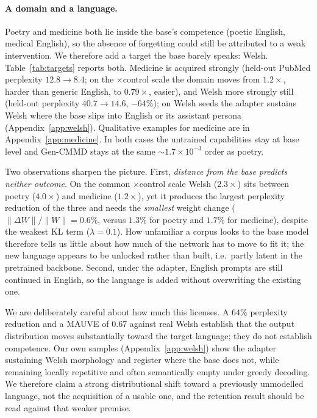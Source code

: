 \documentclass{article}
\begin{document}
\paragraph{A domain and a language.}
Poetry and medicine both lie inside the base's competence (poetic English,
medical English), so the absence of forgetting could still be attributed to a
weak intervention. We therefore add a target the base barely speaks: Welsh.
Table~\ref{tab:targets} reports both. Medicine is acquired strongly (held-out
PubMed perplexity $12.8\to8.4$; on the $\times$control scale the domain moves
from $1.2\times$, harder than generic English, to $0.79\times$, easier), and
Welsh more strongly still (held-out perplexity $40.7\to14.6$, $-64\%$); on Welsh
seeds the adapter sustains Welsh where the base slips into English or its
assistant persona (Appendix~\ref{app:welsh}). Qualitative examples for medicine
are in Appendix~\ref{app:medicine}. In both cases the untrained capabilities stay
at base level and Gen-CMMD stays at the same $\sim\!1.7\times10^{-3}$ order as
poetry.

Two observations sharpen the picture. First, \emph{distance from the base
predicts neither outcome}. On the common $\times$control scale Welsh ($2.3\times$)
sits between poetry ($4.0\times$) and medicine ($1.2\times$), yet it produces the
largest perplexity reduction of the three and needs the \emph{smallest} weight
change ($\lVert\Delta W\rVert/\lVert W\rVert=0.6\%$, versus $1.3\%$ for poetry
and $1.7\%$ for medicine), despite the weakest KL term ($\lambda=0.1$). How
unfamiliar a corpus looks to the base model therefore tells us little about how
much of the network has to move to fit it; the new language appears to be
unlocked rather than built, i.e.\ partly latent in the pretrained backbone.
Second, under the adapter, English prompts are still continued in English, so the
language is added without overwriting the existing one.

We are deliberately careful about how much this licenses. A $64\%$ perplexity
reduction and a MAUVE of $0.67$ against real Welsh establish that the output
distribution moves substantially toward the target language; they do not
establish competence. Our own samples (Appendix~\ref{app:welsh}) show the adapter
sustaining Welsh morphology and register where the base does not, while remaining
locally repetitive and often semantically empty under greedy decoding. We
therefore claim a strong distributional shift toward a previously unmodelled
language, not the acquisition of a usable one, and the retention result should be
read against that weaker premise.
\end{document}
